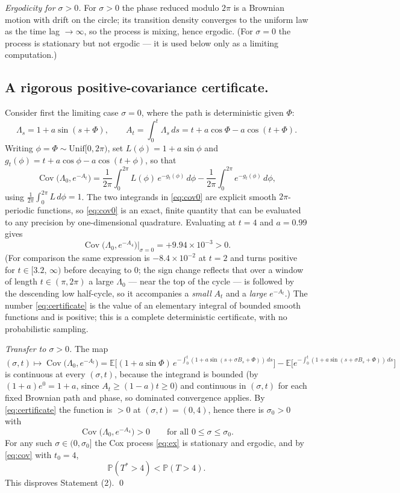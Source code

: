 \documentclass{amsart}
\theoremstyle{plain}
\theoremstyle{definition}
\newcommand{\E}{\mathbb{E}}
\newcommand{\Prob}{\mathbb{P}}
\newcommand{\Lam}{\Lambda}
\DeclareMathOperator{\Cov}{Cov}
\begin{document}
\emph{Ergodicity for $\sigma>0$.} For $\sigma>0$ the phase reduced modulo $2\pi$ is a
Brownian motion with drift on the circle; its transition density converges to the
uniform law as the time lag $\to\infty$, so the process is mixing, hence ergodic. (For
$\sigma=0$ the process is stationary but not ergodic — it is used below only as a
limiting computation.)

\subsection*{A rigorous positive-covariance certificate.}
Consider first the limiting case $\sigma=0$, where the path is deterministic given
$\Phi$:
\[
  \Lam_s=1+a\sin(s+\Phi),\qquad
  A_t=\int_0^t\Lam_s\,ds=t+a\cos\Phi-a\cos(t+\Phi).
\]
Writing $\phi=\Phi\sim\mathrm{Unif}[0,2\pi)$, set $L(\phi)=1+a\sin\phi$ and
$g_t(\phi)=t+a\cos\phi-a\cos(t+\phi)$, so that
\begin{equation}\label{eq:cov0}
  \Cov\big(\Lam_0,e^{-A_t}\big)
   =\frac1{2\pi}\int_0^{2\pi}\!L(\phi)\,e^{-g_t(\phi)}\,d\phi
   -\frac1{2\pi}\int_0^{2\pi}\!e^{-g_t(\phi)}\,d\phi ,
\end{equation}
using $\frac1{2\pi}\int_0^{2\pi}L\,d\phi=1$. The two integrands in \eqref{eq:cov0} are
explicit smooth $2\pi$-periodic functions, so \eqref{eq:cov0} is an exact, finite
quantity that can be evaluated to any precision by one-dimensional quadrature.
Evaluating at $t=4$ and $a=0.99$ gives
\begin{equation}\label{eq:certificate}
  \Cov\big(\Lam_0,e^{-A_4}\big)\Big|_{\sigma=0}=+9.94\times10^{-3}>0 .
\end{equation}
(For comparison the same expression is $-8.4\times10^{-2}$ at $t=2$ and turns positive
for $t\in[3.2,\,\infty)$ before decaying to $0$; the sign change reflects that over a
window of length $t\in(\pi,2\pi)$ a large $\Lam_0$ — near the top of the cycle — is
followed by the descending low half-cycle, so it accompanies a \emph{small} $A_t$ and
a \emph{large} $e^{-A_t}$.) The number \eqref{eq:certificate} is the value of an
elementary integral of bounded smooth functions and is positive; this is a complete
deterministic certificate, with no probabilistic sampling.

\emph{Transfer to $\sigma>0$.} The map
\[
  (\sigma,t)\longmapsto
  \Cov\big(\Lam_0,e^{-A_t}\big)
  =\E\Big[(1+a\sin\Phi)\,e^{-\int_0^t(1+a\sin(s+\sigma B_s+\Phi))\,ds}\Big]
   -\E\big[e^{-\int_0^t(1+a\sin(s+\sigma B_s+\Phi))\,ds}\big]
\]
is continuous at every $(\sigma,t)$, because the integrand is bounded (by
$(1+a)e^{0}=1+a$, since $A_t\ge(1-a)t\ge0$) and continuous in $(\sigma,t)$ for each
fixed Brownian path and phase, so dominated convergence applies. By
\eqref{eq:certificate} the function is $>0$ at $(\sigma,t)=(0,4)$, hence there is
$\sigma_0>0$ with
\[
  \Cov\big(\Lam_0,e^{-A_4}\big)>0\qquad\text{for all }0\le\sigma\le\sigma_0 .
\]
For any such $\sigma\in(0,\sigma_0]$ the Cox process \eqref{eq:ex} is stationary and
ergodic, and by \eqref{eq:cov} with $t_0=4$,
\[
  \Prob(T^\ast>4)<\Prob(T>4).
\]
This disproves Statement (2). \qed
\end{document}

